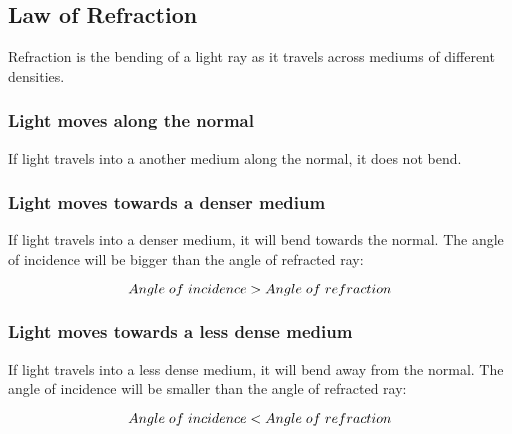 \documentclass{report}
\begin{document}
\begin{flushleft}

\subsection*{Law of Refraction}
\normalfont Refraction is the bending of a light ray as it travels across mediums of different densities. 

\subsubsection*{Light moves along the normal}

\normalfont If light travels into a another medium along the normal, it does not bend.

\subsubsection*{Light moves towards a denser medium}

\normalfont If light travels into a denser medium, it will bend towards the normal. The angle of incidence will be bigger than the angle of refracted ray: 
    
\begin{equation}
Angle \hspace{1mm} of \hspace{1mm} incidence > Angle \hspace{1mm} of \hspace{1mm} refraction 
\end{equation}


\end{flushleft}
\begin{flushleft}

\subsubsection*{Light moves towards a less dense medium}

\normalfont If light travels into a less dense medium, it will bend away from the normal. The angle of incidence will be smaller than the angle of refracted ray: 
    
\begin{equation}
Angle \hspace{1mm} of \hspace{1mm} incidence < Angle \hspace{1mm} of \hspace{1mm} refraction  
\end{equation}


\end{flushleft}
\end{document}
